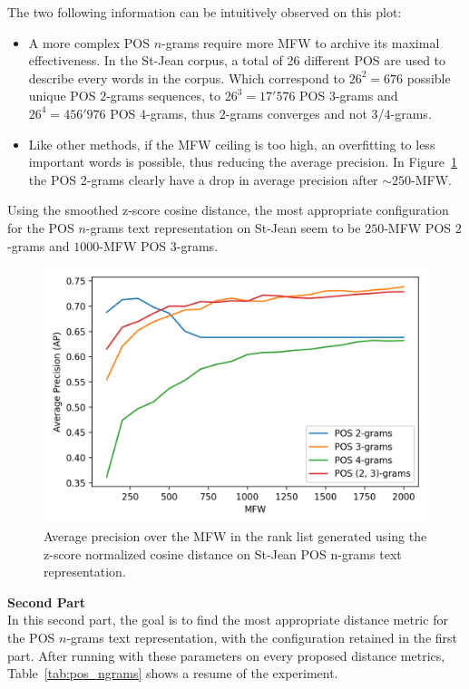 The two following information can be intuitively observed on this plot:
\begin{itemize}
  \item
  A more complex POS $n$-grams require more MFW to archive its maximal effectiveness.
  In the St-Jean corpus, a total of 26 different POS are used to describe every words in the corpus.
  Which correspond to $26^2 = 676$ possible unique POS $2$-grams sequences, to $26^3 = 17'576$ POS $3$-grams and $26^4 = 456'976$ POS $4$-grams, thus $2$-grams converges and not $3$/$4$-grams.
  \item
  Like other methods, if the MFW ceiling is too high, an overfitting to less important words is possible, thus reducing the average precision.
  In Figure~\ref{fig:pos_ngrams} the POS 2-grams clearly have a drop in average precision after $\sim 250$-MFW.
\end{itemize}

Using the smoothed z-score cosine distance, the most appropriate configuration for the POS $n$-grams text representation on St-Jean seem to be $250$-MFW POS $2$-grams and $1000$-MFW POS $3$-grams.

\begin{figure}
  \centering
  \caption{Average precision over the MFW in the rank list generated using the z-score normalized cosine distance on St-Jean POS n-grams text representation.}
  \label{fig:pos_ngrams}
  \includegraphics[width=\linewidth]{img/pos_ngrams.png}
\end{figure}

\textbf{Second Part}\\
In this second part, the goal is to find the most appropriate distance metric for the POS $n$-grams text representation, with the configuration retained in the first part.
After running with these parameters on every proposed distance metrics, Table~\ref{tab:pos_ngrams} shows a resume of the experiment.

